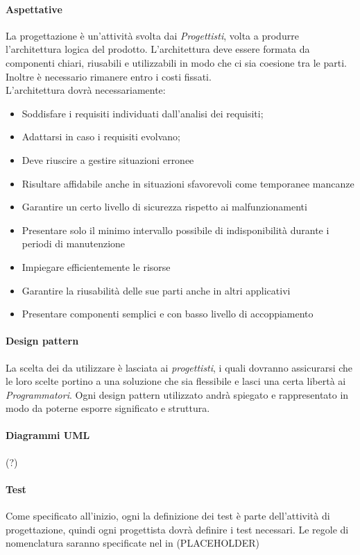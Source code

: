 \documentclass[../norme_di_progetto.tex]{subfiles}
\begin{document}
 \paragraph{Aspettative}
 La progettazione è un'attività svolta dai \emph{Progettisti}, volta a produrre l'architettura logica del prodotto. L'architettura deve essere formata da componenti chiari, riusabili e utilizzabili in modo che ci sia coesione tra le parti. Inoltre è necessario rimanere entro i costi fissati.\\
 L'architettura dovrà necessariamente: 
 \begin{itemize}
     \item Soddisfare i requisiti individuati dall'analisi dei requisiti;
     \item Adattarsi in caso i requisiti evolvano;
     \item Deve riuscire a gestire situazioni erronee
     \item Risultare affidabile anche in situazioni sfavorevoli come temporanee mancanze
     \item Garantire un certo livello di sicurezza rispetto ai malfunzionamenti
     \item Presentare solo il minimo intervallo possibile di indisponibilità durante i periodi di manutenzione
     \item Impiegare efficientemente le risorse
     \item Garantire la riusabilità delle sue parti anche in altri applicativi
     \item Presentare componenti semplici e con basso livello di accoppiamento
 \end{itemize}
 
 
 \paragraph{Design pattern}
 La scelta dei  da utilizzare è lasciata ai \emph{progettisti}, i quali dovranno assicurarsi che le loro scelte portino a una soluzione che sia flessibile e lasci una certa libertà ai \emph{Programmatori}. Ogni design pattern utilizzato andrà spiegato e rappresentato in modo da poterne esporre significato e struttura.
 
 \paragraph{Diagrammi UML}
 (?)
 
 
 \paragraph{Test}
  Come specificato all'inizio, ogni la definizione dei test è parte dell'attività di progettazione, quindi ogni progettista dovrà definire i test necessari. Le regole di nomenclatura saranno specificate nel in (PLACEHOLDER)
  
\end{document}
